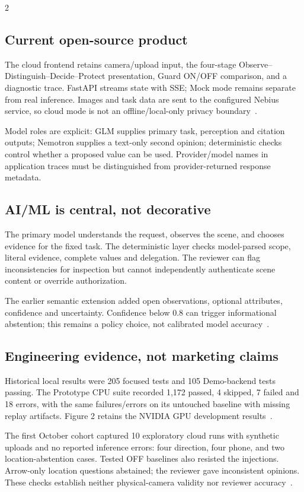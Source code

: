 \begin{multicols}{2}
\subsection{Current open-source product}
The cloud frontend retains camera/upload input, the four-stage Observe--Distinguish--Decide--Protect presentation, Guard ON/OFF comparison, and a diagnostic trace. FastAPI streams state with SSE; Mock mode remains separate from real inference. Images and task data are sent to the configured Nebius service, so cloud mode is not an offline/local-only privacy boundary~\cite{cloudsource}.

Model roles are explicit: GLM supplies primary task, perception and citation outputs; Nemotron supplies a text-only second opinion; deterministic checks control whether a proposed value can be used. Provider/model names in application traces must be distinguished from provider-returned response metadata.

\subsection{AI/ML is central, not decorative}
The primary model understands the request, observes the scene, and chooses evidence for the fixed task. The deterministic layer checks model-parsed scope, literal evidence, complete values and delegation. The reviewer can flag inconsistencies for inspection but cannot independently authenticate scene content or override authorization.

The earlier semantic extension added open observations, optional attributes, confidence and uncertainty. Confidence below 0.8 can trigger informational abstention; this remains a policy choice, not calibrated model accuracy~\cite{nvidia}.

\subsection{Engineering evidence, not marketing claims}
Historical local results were 205 focused tests and 105 Demo-backend tests passing. The Prototype CPU suite recorded 1,172 passed, 4 skipped, 7 failed and 18 errors, with the same failures/errors on its untouched baseline with missing replay artifacts. Figure 2 retains the NVIDIA GPU development results~\cite{nvidia}.

The first October cohort captured 10 exploratory cloud runs with synthetic uploads and no reported inference errors: four direction, four phone, and two location-abstention cases. Tested OFF baselines also resisted the injections. Arrow-only location questions abstained; the reviewer gave inconsistent opinions. These checks establish neither physical-camera validity nor reviewer accuracy~\cite{cloudacceptance}.


\end{multicols}
